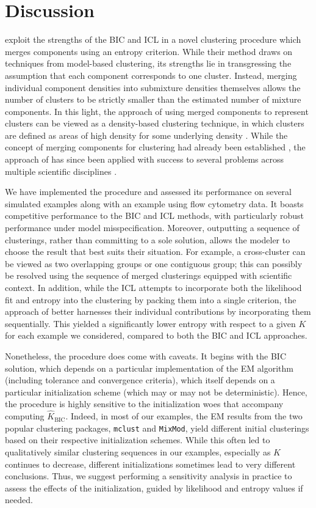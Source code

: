 \documentclass{uwstat572}
\newcommand*\estim[1]{\widehat{#1}}
\renewcommand\;{\,}
\begin{document}
\section{Discussion}
\cite{Baudry10} exploit the strengths of the BIC and ICL in a novel clustering procedure which merges components using an entropy criterion.
While their method draws on techniques from model-based clustering, its strengths lie in transgressing the assumption that each component corresponds to one cluster.
Instead, merging individual component densities into submixture densities themselves allows the number of clusters to be strictly smaller than the estimated number of mixture components.
In this light, the approach of using merged components to represent clusters can be viewed as a density-based clustering technique, in which clusters are defined as areas of high density for some underlying density \citep{Hans11}.
While the concept of merging components for clustering had already been established \citep{Hennig10}, the approach of \cite{Baudry10} has since been applied with success to several problems across multiple scientific disciplines \citep{Huang14, Ho12, Gormley11}. 

We have implemented the procedure and assessed its performance on several simulated examples along with an example using flow cytometry data.
It boasts competitive performance to the BIC and ICL methods, with particularly robust performance under model misspecification.
Moreover, outputting a sequence of clusterings, rather than committing to a sole solution, allows the modeler to choose the result that best suits their situation.
For example, a cross-cluster can be viewed as two overlapping groups or one contiguous group; this can possibly be resolved using the sequence of merged clusterings equipped with scientific context.
In addition, while the ICL attempts to incorporate both the likelihood fit and entropy into the clustering by packing them into a single criterion, the approach of \cite{Baudry10} better harnesses their individual contributions by incorporating them sequentially.
This yielded a significantly lower entropy with respect to a given $K$ for each example we considered, compared to both the BIC and ICL approaches.


Nonetheless, the procedure does come with caveats.
It begins with the BIC solution, which depends on a particular implementation of the EM algorithm (including tolerance and convergence criteria), which itself depends on a particular initialization scheme (which may or may not be deterministic).
Hence, the procedure is highly sensitive to the initialization woes that accompany computing $\estim K_\text{BIC}$.
Indeed, in most of our examples, the EM results from the two popular clustering packages, \texttt{mclust} and \texttt{MixMod}, yield different initial clusterings based on their respective initialization schemes.
While this often led to qualitatively similar clustering sequences in our examples, especially as $K$ continues to decrease, different initializations sometimes lead to very different conclusions.
Thus, we suggest performing a sensitivity analysis in practice to assess the effects of the initialization, guided by likelihood and entropy values if needed.
\end{document}
